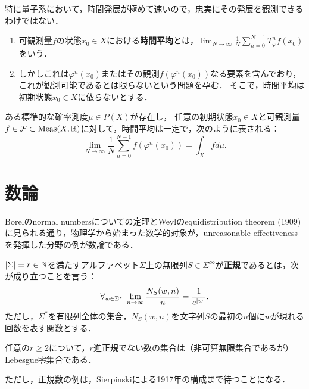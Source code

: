 \documentclass[uplatex,dvipdfmx]{jsreport}
\begin{document}
\begin{definition}
    特に量子系において，時間発展が極めて速いので，忠実にその発展を観測できるわけではない．
    \begin{enumerate}
        \item 可観測量$f$の状態$x_0\in X$における\textbf{時間平均}とは，$\lim_{N\to\infty}\frac{1}{N}\sum^{N-1}_{n=0}T^n_{\varphi}f(x_0)$をいう．
        \item しかしこれは$\varphi^n(x_0)$またはその観測$f(\varphi^n(x_0))$なる要素を含んでおり，これが観測可能であるとは限らないという問題を孕む．
        そこで，時間平均は初期状態$x_0\in X$に依らないとする．
    \end{enumerate}
\end{definition}

\begin{hypothesis}
    ある標準的な確率測度$\mu\in P(X)$が存在し，
    任意の初期状態$x_0\in X$と可観測量$f\in\mathcal{F}\subset\mathrm{Meas}(X,\mathbb{R})$に対して，時間平均は一定で，次のように表される：
    \[\lim_{N\to\infty}\frac{1}{N}\sum^{N-1}_{n=0}f(\varphi^n(x_0))=\int_Xfd\mu.\]
\end{hypothesis}

\section{数論}

\begin{tcolorbox}[colframe=ForestGreen, colback=ForestGreen!10!white,breakable,colbacktitle=ForestGreen!40!white,coltitle=black,fonttitle=\bfseries\sffamily,
title=]
    Borelのnormal numbersについての定理とWeylのequidistribution theorem (1909)に見られる通り，物理学から始まった数学的対象が，unreasonable effectivenessを発揮した分野の例が数論である．
\end{tcolorbox}

\begin{definition}
    $\lvert\Sigma\rvert=r\in\mathbb{N}$を満たすアルファベット$\Sigma$上の無限列$S\in\Sigma^\infty$が\textbf{正規}であるとは，次が成り立つことを言う：
    \[\forall_{w\in\Sigma^*}\;\lim_{n\to\infty}\frac{N_S(w,n)}{n}=\frac{1}{e^{\lvert w\rvert}}.\]
    ただし，$\Sigma^*$を有限列全体の集合，$N_S(w,n)$を文字列$S$の最初の$n$個に$w$が現れる回数を表す関数とする．
\end{definition}

\begin{theorem}[Borel]
    任意の$r\ge 2$について，$r$進正規でない数の集合は（非可算無限集合であるが）Lebesgue零集合である．
\end{theorem}
\begin{remark}
    ただし，正規数の例は，Sierpinskiによる1917年の構成まで待つことになる．
\end{remark}
\end{document}
